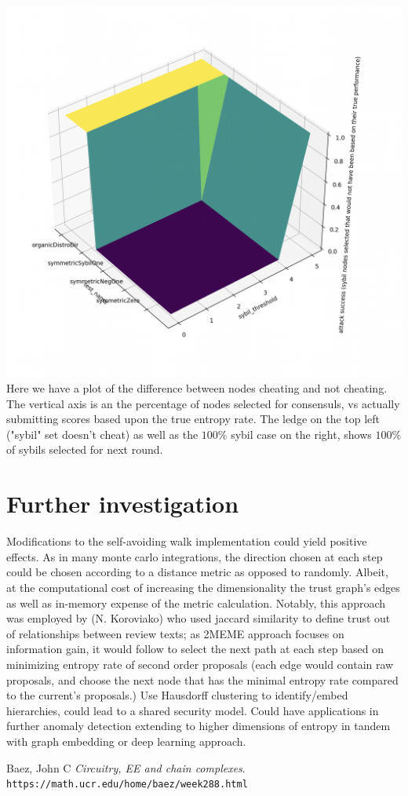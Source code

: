 \documentclass{article}
\begin{document}
\includegraphics[width=\textwidth, height=\textwidth]{attack-success-suface-plot}
Here we have a plot of the difference between nodes cheating and not cheating. The vertical axis is an the percentage of nodes selected for consensuls, vs actually submitting scores based upon the true entropy rate. The ledge on the top left ("sybil" set doesn't cheat) as well as the $100\%$ sybil case on the right, shows $100\%$ of sybils selected for next round. 

\section{Further investigation}
	Modifications to the self-avoiding walk implementation could yield positive effects. As in many monte carlo integrations, the direction chosen at each step could be chosen according to a distance metric as opposed to randomly. Albeit, at the computational cost of increasing the dimensionality the trust graph’s edges as well as in-memory expense of the metric calculation. Notably, this approach was employed by (N. Koroviako) who used jaccard similarity to define trust out of relationships between review texts; as 2MEME approach focuses on information gain, it would follow to select the next path at each step based on minimizing entropy rate of second order proposals (each edge would contain raw proposals, and choose the next node that has the minimal entropy rate compared to the current’s proposals.)
	Use Hausdorff clustering to identify/embed hierarchies, could lead to a shared security model. Could have applications in further anomaly detection extending to higher dimensions of entropy in tandem with graph embedding or deep learning approach.
	
	




\begin{thebibliography}{9}
Baez, John C
\textit{Circuitry, EE and chain complexes}.
\\\texttt{https://math.ucr.edu/home/baez/week288.html}

\end{thebibliography}
\end{document}
